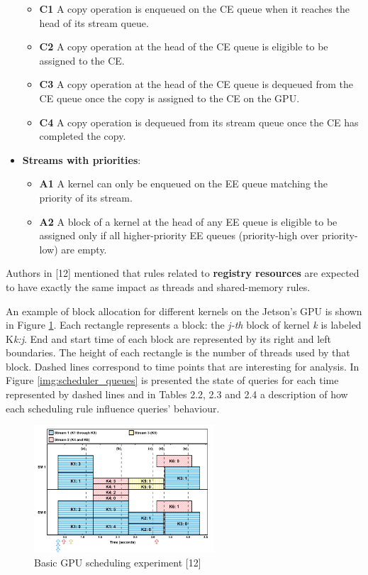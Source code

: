 \documentclass[
  12pt,
  a4paperpaper,
]{report}
\providecommand{\tightlist}{%
  \setlength{\itemsep}{0pt}\setlength{\parskip}{0pt}}
\begin{document}
\begin{itemize}
  \begin{itemize}
  \tightlist
  \item
    \textbf{C1} A copy operation is enqueued on the CE queue when it
    reaches the head of its stream queue.
  \item
    \textbf{C2} A copy operation at the head of the CE queue is eligible
    to be assigned to the CE.
  \item
    \textbf{C3} A copy operation at the head of the CE queue is dequeued
    from the CE queue once the copy is assigned to the CE on the GPU.
  \item
    \textbf{C4} A copy operation is dequeued from its stream queue once
    the CE has completed the copy.
  \end{itemize}
\item
  \textbf{Streams with priorities}:

  \begin{itemize}
  \tightlist
  \item
    \textbf{A1} A kernel can only be enqueued on the EE queue matching
    the priority of its stream.
  \item
    \textbf{A2} A block of a kernel at the head of any EE queue is
    eligible to be assigned only if all higher-priority EE queues
    (priority-high over priority-low) are empty.
  \end{itemize}
\end{itemize}

Authors in {[}12{]} mentioned that rules related to \textbf{registry
resources} are expected to have exactly the same impact as threads and
shared-memory rules.

An example of block allocation for different kernels on the Jetson's GPU  is shown in Figure \ref{img:scheduler_blocks}.
Each rectangle represents a block: the \textit{j-th} block of kernel \textit{k} is labeled K\textit{k:j}. 
End and start time of each block are represented by its right and left boundaries. 
The height of each rectangle is the number of threads used by that block.
Dashed lines correspond to time points that are interesting for analysis. 
In Figure \ref{img:scheduler_queues} is presented the state of queries for each time represented by dashed lines and in Tables 2.2, 2.3 and 2.4 a description of how each  scheduling rule influence queries' behaviour.

\begin{figure}
\centering
\includegraphics[width=0.6\textwidth,height=\textheight]{source/figures/scheduler_blocks.png}
\caption{Basic GPU scheduling experiment {[}12{]}
\label{img:scheduler_blocks}}
\end{figure}
\end{document}
